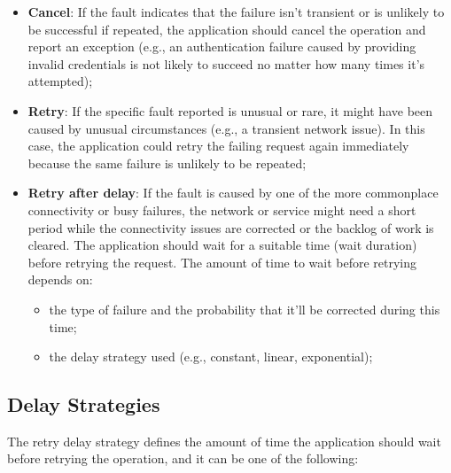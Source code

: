 \begin{itemize}
    \item \textbf{Cancel}: If the fault indicates that the failure isn't transient or is unlikely to be successful if repeated, the application should cancel the operation and report an exception (e.g., an authentication failure caused by providing invalid credentials is not likely to succeed no matter how many times it's attempted);
    \item \textbf{Retry}: If the specific fault reported is unusual or rare, it might have been caused by unusual circumstances (e.g., a transient network issue).
    In this case, the application could retry the failing request again immediately because the same failure is unlikely to be repeated;
    \item \textbf{Retry after delay}: If the fault is caused by one of the more commonplace connectivity or busy failures, the network or service might need a short period while the connectivity issues are corrected or the backlog of work is cleared.
    The application should wait for a suitable time (wait duration) before retrying the request.
    The amount of time to wait before retrying depends on:
    \begin{itemize}
        \item the type of failure and the probability that it'll be corrected during this time;
        \item the delay strategy used (e.g., constant, linear, exponential);
    \end{itemize}
\end{itemize}

\subsection{Delay Strategies}\label{subsec:retry-delay-strategies}

The retry delay strategy defines the amount of time the application should wait before retrying the operation, and it can be one of the following:

